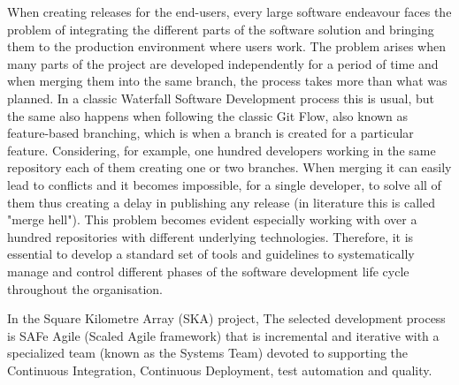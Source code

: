 \documentclass[a4paper,
               keeplastbox,   %
               ]{jacow}
\begin{document}
When creating releases for the end-users, every large software endeavour faces the problem of integrating the different parts of the software solution and bringing them to the production environment where users work. The problem arises when many parts of the project are developed independently for a period of time and when merging them into the same branch, the process takes more than what was planned. In a classic Waterfall Software Development process this is usual, but the same also happens when following the classic Git Flow, also known as feature-based branching, which is when a branch is created for a particular feature. Considering, for example, one hundred developers working in the same repository each of them creating one or two branches. When merging it can easily lead to conflicts and it becomes impossible, for a single developer, to solve all of them thus creating a delay in publishing any release (in literature this is called "merge hell"). This problem becomes evident especially working with over a hundred repositories with different underlying technologies. Therefore, it is essential to develop a standard set of tools and guidelines to systematically manage and control different phases of the software development life cycle throughout the organisation.

In the Square Kilometre Array (SKA) project, The selected development process is SAFe Agile (Scaled Agile framework) that is incremental and iterative with a specialized team (known as the Systems Team) devoted to supporting the Continuous Integration, Continuous Deployment, test automation and quality.
\end{document}
